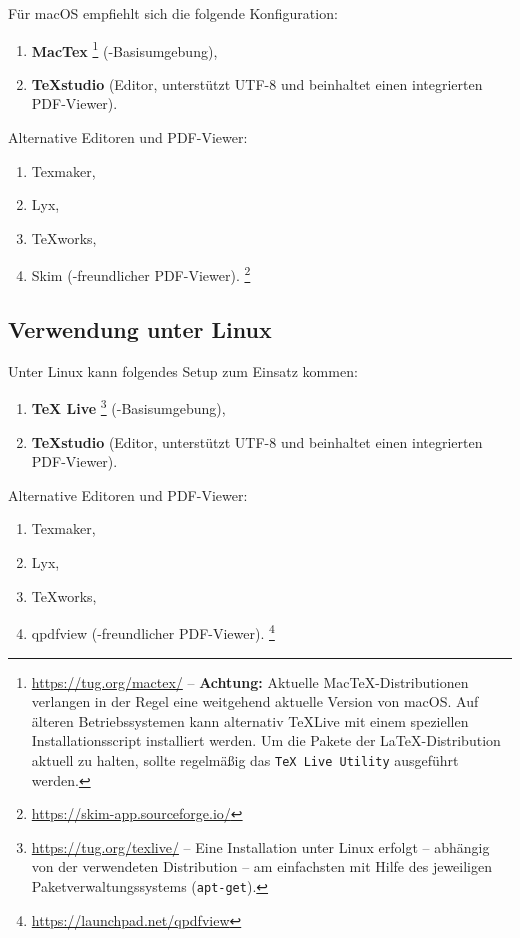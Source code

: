 Für macOS empfiehlt sich die folgende Konfiguration:
%
\begin{enumerate}
\item 
	\textbf{MacTex}%
	\footnote{\url{https://tug.org/mactex/} -- \textbf{Achtung:} Aktuelle
	MacTeX-Distributionen verlangen in der Regel eine weitgehend aktuelle Version
	von macOS. Auf älteren Betriebssystemen kann alternativ TeXLive mit einem
	speziellen Installationsscript installiert werden. Um die Pakete der
	\LaTeX-Distribution aktuell zu halten, sollte regelmäßig das \texttt{TeX Live
	Utility} ausgeführt werden.}
	(\latex-Basisumgebung),
\item \textbf{TeXstudio} (Editor, unterstützt UTF-8 und beinhaltet einen
integrierten PDF-Viewer).
\end{enumerate}
%
Alternative Editoren und PDF-Viewer:
%
\begin{enumerate}
	\item Texmaker,%
	\item Lyx,%
	\item TeXworks,%
	\item Skim (\latex-freundlicher PDF-Viewer).%
	\footnote{\url{https://skim-app.sourceforge.io/}}
\end{enumerate}


\subsection{Verwendung unter Linux}

Unter Linux kann folgendes Setup zum Einsatz kommen:
%
\begin{enumerate}
	\item 
	\textbf{TeX Live}%
	\footnote{\url{https://tug.org/texlive/} -- Eine Installation unter Linux
	erfolgt -- abhängig von der verwendeten Distribution -- am einfachsten mit
	Hilfe des jeweiligen Paketverwaltungssystems (\zB \texttt{apt-get}).}
	(\latex-Basisumgebung),
	\item \textbf{TeXstudio} (Editor, unterstützt UTF-8 und beinhaltet einen
	integrierten PDF-Viewer).
\end{enumerate}
%
Alternative Editoren und PDF-Viewer:
%
\begin{enumerate}
	\item Texmaker,%
	\item Lyx,%
	\item TeXworks,%
	\item qpdfview (\latex-freundlicher PDF-Viewer).%
	\footnote{\url{https://launchpad.net/qpdfview}}
\end{enumerate}

